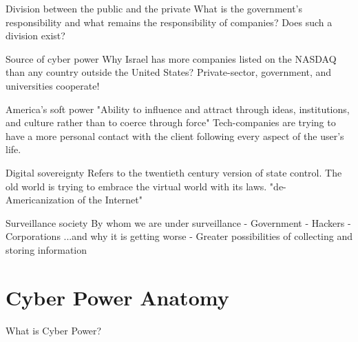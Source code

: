 \documentclass[xcolor=table]{beamer}
\begin{document}
\begin{frame}{Division between the public and the private}
	\large{What is the government's responsibility and what remains the responsibility of companies?
	Does such a division exist? }
\end{frame}

\begin{frame}{Source of cyber power}
\large{Why Israel has more companies listed on the NASDAQ than any country outside
the United States?}\newline
Private-sector, government, and universities cooperate!
\end{frame}

\begin{frame}{America's soft power}
"Ability to influence
and attract through ideas, institutions, and culture rather than to
coerce through force"\newline
\newline
Tech-companies are trying to have a more personal contact with the client following every aspect of the user's life.
\end{frame}
\begin{frame}{Digital sovereignty}
Refers to the twentieth century version of state control.\newline
The old world is trying to embrace the virtual world with its laws. \newline
"de-Americanization of the Internet"
\end{frame}
\begin{frame}{Surveillance society}
By whom we are under surveillance\newline
- Government \newline
- Hackers \newline
- Corporations \newline
\newline
...and why it is getting worse \newline
- Greater possibilities of collecting and storing information
\end{frame}
\section{Cyber Power Anatomy}
\begin{frame}{}
\Huge{\centerline{What is Cyber Power?}}
\end{frame}
\end{document}
